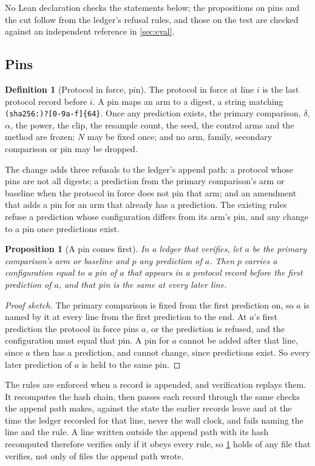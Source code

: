 \documentclass[11pt]{article}
\theoremstyle{plain}
\newtheorem{proposition}[theorem]{Proposition}
\theoremstyle{definition}
\newtheorem{definition}[theorem]{Definition}
\theoremstyle{remark}
\begin{document}
No Lean declaration checks the statements below; the propositions on pins and the cut follow from
the ledger's refusal rules, and those on the test are checked against an independent reference in
\cref{sec:eval}.

\subsection{Pins}\label{sec:pins}

\begin{definition}[Protocol in force, pin]
The protocol in force at line $i$ is the last protocol record before $i$. A pin maps an arm to a
digest, a string matching \texttt{(sha256:)?[0-9a-f]\{64\}}. Once any prediction exists, the
primary comparison, $\delta$, $\alpha$, the power, the clip, the resample count, the seed, the
control arms and the method are frozen; $N$ may be fixed once; and no arm, family, secondary
comparison or pin may be dropped.
\end{definition}

The change adds three refusals to the ledger's append path: a protocol whose pins are not all
digests; a prediction from the primary comparison's arm or baseline when the protocol in force does
not pin that arm; and an amendment that adds a pin for an arm that already has a prediction. The
existing rules refuse a prediction whose configuration differs from its arm's pin, and any change
to a pin once predictions exist.

\begin{proposition}[A pin comes first]\label{prop:pins}
In a ledger that verifies, let $a$ be the primary comparison's arm or baseline
and $p$ any prediction of $a$. Then $p$ carries a configuration equal to a pin of $a$ that appears
in a protocol record before the first prediction of $a$, and that pin is the same at every later
line.
\end{proposition}
\begin{proof}[Proof sketch]
The primary comparison is fixed from the first prediction on, so $a$ is named by it at every line
from the first prediction to the end. At $a$'s first prediction the protocol in force pins $a$, or
the prediction is refused, and the configuration must equal that pin. A pin for $a$ cannot be
added after that line, since $a$ then has a prediction, and cannot change, since predictions
exist. So every later prediction of $a$ is held to the same pin.
\end{proof}

The rules are enforced when a record is appended, and verification replays them. It recomputes
the hash chain, then passes each record through the same checks the append path makes, against the
state the earlier records leave and at the time the ledger recorded for that line, never the wall
clock, and fails naming the line and the rule. A line written outside the append path with its
hash recomputed therefore verifies only if it obeys every rule, so \cref{prop:pins} holds of any
file that verifies, not only of files the append path wrote.
\end{document}
